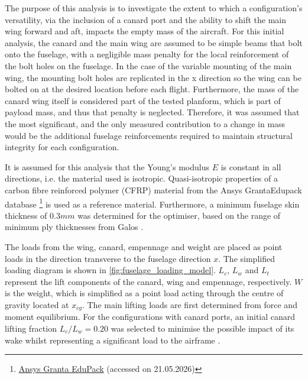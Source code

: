 
The purpose of this analysis is to investigate the extent to which a configuration's versatility, via the inclusion of a canard port and the ability to shift the main wing forward and aft, impacts the empty mass of the aircraft. For this initial analysis, the canard and the main wing are assumed to be simple beams that bolt onto the fuselage, with a negligible mass penalty for the local reinforcement of the bolt holes on the fuselage. In the case of the variable mounting of the main wing, the mounting bolt holes are replicated in the x direction so the wing can be bolted on at the desired location before each flight.  Furthermore, the mass of the canard wing itself is considered part of the tested planform, which is part of payload mass, and thus that penalty is neglected. Therefore, it was assumed that the most significant, and the only measured contribution to a change in mass would be the additional fuselage reinforcements required to maintain structural integrity for each configuration.


It is assumed for this analysis that the Young's modulus $E$ is constant in all directions, i.e. the material used is isotropic. Quasi-isotropic properties of a carbon fibre reinforced polymer (CFRP) material from the Ansys GrantaEdupack database \footnote{\href{https://www.ansys.com/products/materials/granta-edupack}{Ansys Granta EduPack} (accessed on 21.05.2026)} is used as a reference material. Furthermore, a minimum fuselage skin thickness of $0.3mm$ was determined for the optimiser, based on the range of minimum ply thicknesses from Galos \cite{galos2020thin}.

The loads from the wing, canard, empennage and weight are placed as point loads in the direction transverse to the fuselage direction $x$. The simplified loading diagram is shown in \autoref{fig:fuselage_loading_model}. $L_c$, $L_w$ and $L_t$ represent the lift components of the canard, wing and empennage, respectively. $W$ is the weight, which is simplified as a point load acting through the centre of gravity located at $x_{cg}$. The main lifting loads are first determined from force and moment equilibrium. For the configurations with canard ports, an initial canard lifting fraction $L_c / L_w = 0.20$ was selected to minimise the possible impact of its wake whilst representing a significant load to the airframe \cite{AdvancedACDesign_Torenbeek}.


